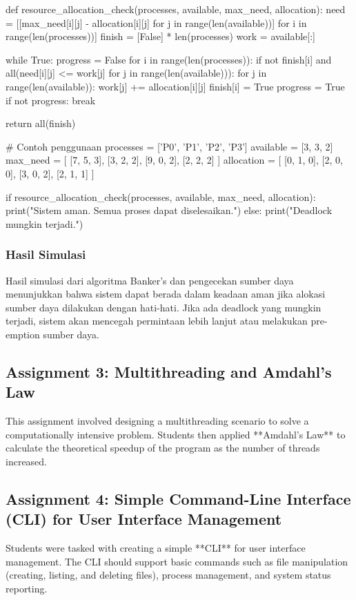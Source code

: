 \documentclass[12pt]{article}
\begin{document}
\begin{python}[language=Python, caption=Implementasi Pengecekan Alokasi Sumber Daya]
def resource_allocation_check(processes, available, max_need, allocation):
    need = [[max_need[i][j] - allocation[i][j] for j in range(len(available))] for i in range(len(processes))]
    finish = [False] * len(processes)
    work = available[:]
    
    while True:
        progress = False
        for i in range(len(processes)):
            if not finish[i] and all(need[i][j] <= work[j] for j in range(len(available))):
                for j in range(len(available)):
                    work[j] += allocation[i][j]
                finish[i] = True
                progress = True
        if not progress:
            break

    return all(finish)

# Contoh penggunaan
processes = ['P0', 'P1', 'P2', 'P3']
available = [3, 3, 2]
max_need = [
    [7, 5, 3],
    [3, 2, 2],
    [9, 0, 2],
    [2, 2, 2]
]
allocation = [
    [0, 1, 0],
    [2, 0, 0],
    [3, 0, 2],
    [2, 1, 1]
]

if resource_allocation_check(processes, available, max_need, allocation):
    print("Sistem aman. Semua proses dapat diselesaikan.")
else:
    print("Deadlock mungkin terjadi.")
\end{python}

\subsubsection{Hasil Simulasi}
Hasil simulasi dari algoritma Banker's dan pengecekan sumber daya menunjukkan bahwa sistem dapat berada dalam keadaan aman jika alokasi sumber daya dilakukan dengan hati-hati. Jika ada deadlock yang mungkin terjadi, sistem akan mencegah permintaan lebih lanjut atau melakukan pre-emption sumber daya.

\subsection{Assignment 3: Multithreading and Amdahl's Law}
This assignment involved designing a multithreading scenario to solve a computationally intensive problem. Students then applied **Amdahl's Law** to calculate the theoretical speedup of the program as the number of threads increased.

\subsection{Assignment 4: Simple Command-Line Interface (CLI) for User Interface Management}
Students were tasked with creating a simple **CLI** for user interface management. The CLI should support basic commands such as file manipulation (creating, listing, and deleting files), process management, and system status reporting.
\end{document}

